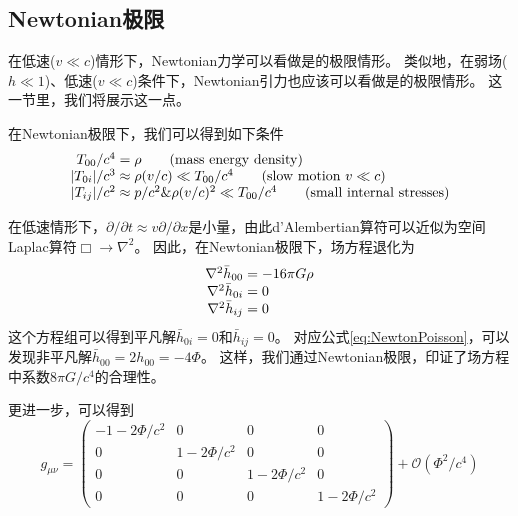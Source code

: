 \subsection{Newtonian极限}
在低速($v \ll c$)情形下，Newtonian力学可以看做是\SR 的极限情形。
类似地，在弱场($h \ll 1$)、低速($v \ll c$)条件下，Newtonian引力也应该可以看做是\GR 的极限情形。
这一节里，我们将展示这一点。

在Newtonian极限下，我们可以得到如下条件
\begin{equation}\label{eq:TmunuNewton}
\begin{array}{r@{}l}
  T_{00}/c^4      &{} = \rho \qquad ({\rm mass~energy~density}) \\
  | T_{0i}| /c^3  &{} \approx \rho (v/c) \ll T_{00}/c^4 \qquad ({\rm slow~motion}~v \ll c) \\
  | T_{ij}| /c^2  &{} \approx p/c^2 \& \rho(v/c)^2 \ll T_{00}/c^4 \qquad ({\rm small~internal~stresses})
\end{array}
\end{equation}

在低速情形下，$\partial /\partial t \approx v \partial /\partial x $是小量，由此d’Alembertian算符可以近似为空间Laplac算符$\Box \to \nabla^2$。
因此，在Newtonian极限下，场方程退化为
\begin{equation}\label{eq:EinsteinEqNewton}
\begin{array}{r@{}l}
  \nabla^2 \bar{h}_{00} &{}= -16\pi G \rho\\
  \nabla^2 \bar{h}_{0i} &{}= 0 \\
  \nabla^2 \bar{h}_{ij} &{}= 0 \\
\end{array}
\end{equation}
这个方程组可以得到平凡解$\bar{h}_{0i} = 0$和$\bar{h}_{ij}= 0 $。
对应公式\ref{eq:NewtonPoisson}，可以发现非平凡解$\bar{h}_{00}=2h_{00}=-4\Phi$。
这样，我们通过Newtonian极限，印证了场方程中系数$8\pi G/c^4$的合理性。

更进一步，可以得到
\begin{equation}\label{eq:NewtonianMetric}
  g_{\mu\nu} ={\begin{pmatrix}
    -1-2\Phi/c^2 & 0 & 0 & 0\\
    0 & 1-2\Phi/c^2 & 0 & 0\\ 
    0 & 0 & 1-2\Phi/c^2 & 0\\
    0 & 0 & 0 & 1-2\Phi/c^2\end{pmatrix}} + \mathcal{O}(\Phi^2/c^4)
\end{equation}


